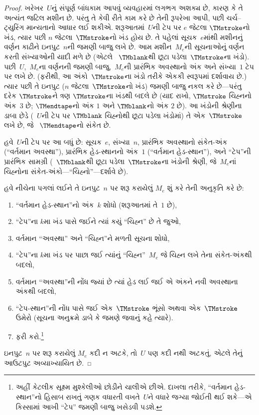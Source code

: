 \begin{proof}
  ખરેખર~$U$નું સંપૂર્ણ બાંધકામ આપવું વ્યવહારમાં લગભગ અશક્ય
  છે, કારણ કે તે અત્યંત જટિલ મશીન છે. પરંતુ તે કેવી રીતે
  કામ કરે છે તેની રૂપરેખા આપી, પછી ચર્ચ--ટ્યુરિંગ માન્યતાનો
  આધાર લઈ શકીએ. શરૂઆતમાં~$U$ની ટેપ પર $e$ જેટલા
  $\TMstroke$નો ખંડ, ત્યાર પછી $n$ જેટલા~$\TMstroke$નો
  ખંડ હોય છે. તે પહેલાં સૂચક~$e$માંથી મશીનનું વર્ણન
  કાઢીને ઇનપુટ~$n$ની જમણી બાજુ લખે છે. આમ મશીન~$M_e$ની
  સૂચનાઓનું વર્ણન કરતી સંખ્યાઓની યાદી મળે છે (એટલે
  ~$\TMblank$થી છૂટા પડેલા~$\TMstroke$ના ખંડો).
  પછી~$U$,~$M_e$ના વર્ણનની જમણી બાજુ,~$M_e$ની પ્રારંભિક
  અવસ્થાનો અંક અને સંખ્યા~$1$ ટેપ પર લખે છે. (ફરીથી,
  આ અંકો~$\TMstroke$ના ખંડો તરીકે એકકી સ્વરૂપમાં દર્શાવાય
  છે.) ત્યાર પછી તે ઇનપુટ ($n$ જેટલા~$\TMstroke$નો ખંડ)
  જમણી બાજુ નકલ કરે છે---પરંતુ દરેક $\TMstroke$ને
  ત્રણ $\TMstroke$ના ખંડથી બદલે છે (યાદ રાખો,
  $\TMstroke$ ચિહ્નનો અંક~$3$ છે; $\TMendtape$નો અંક
  $1$ અને $\TMblank$નો અંક $2$ છે). આ ખંડોની શ્રેણીના
  ડાબા છેડે (~$U$ની ટેપ પર $\TMblank$ ચિહ્નોથી છૂટા
  પડેલા ખંડોમાં) તે એક~$\TMstroke$ લખે છે, જે
  ~$\TMendtape$નો સંકેત છે.

  હવે~$U$ની ટેપ પર આ બધું છે: સૂચક~$e$, સંખ્યા~$n$,
  પ્રારંભિક અવસ્થાનો સંકેત-અંક (``વર્તમાન અવસ્થા''),
  પ્રારંભિક હેડ-સ્થાનનો અંક~$1$ (``વર્તમાન હેડ-સ્થાન''),
  અને ``ટેપ''ની પ્રારંભિક સામગ્રી (~$\TMblank$થી છૂટા
  પડેલા~$\TMstroke$ના ખંડોની શ્રેણી, જે~$M_e$નાં
  ચિહ્નોના સંકેત-અંકો---``ચિહ્નો''---દર્શાવે છે).

  હવે નીચેના પગલાં લઈને તે ઇનપુટ~$n$ પર શરૂ કરાયેલું
  $M_e$ શું કરે તેની અનુકૃતિ કરે છે:
  \begin{enumerate}
    \item ``વર્તમાન હેડ-સ્થાન''નો અંક~$k$ શોધો
    (શરૂઆતમાં તે~$1$ છે),
    \item ``ટેપ''ના $k$મા ખંડ પાસે જઈને ત્યાં કયું
    ``ચિહ્ન'' છે તે જુઓ,
    \item{}%
    વર્તમાન ``અવસ્થા'' અને ``ચિહ્ન''ને મળતી સૂચના શોધો,
    \item ``ટેપ''ના $k$મા ખંડ પર પાછા જઈ ત્યાંનું
    ``ચિહ્ન''~$M_e$ જે ચિહ્ન લખે તેના સંકેત-અંકથી બદલો,
    \item વર્તમાન ``અવસ્થા''ની નોંધ જ્યાં છે ત્યાં હેડ
    લઈ જઈ એ અંકને નવી અવસ્થાના અંકથી બદલો,
    \item ``ટેપ-સ્થાન''ની નોંધ પાસે જઈ એક~$\TMstroke$
    ભૂંસો અથવા એક~$\TMstroke$ ઉમેરો (સૂચના અનુક્રમે
    ડાબે કે જમણે જવાનું કહે ત્યારે).
    \item ફરી કરો.\footnote{અહીં કેટલીક સૂક્ષ્મ મુશ્કેલીઓ
    છોડીને ચાલીએ છીએ. દાખલા તરીકે, ``વર્તમાન હેડ-સ્થાન''નો
    હિસાબ રાખતું ગણક વધારતી વખતે~$U$ને વધારે જગ્યા
    જોઈતી થઈ શકે---એ કિસ્સામાં આખી ``ટેપ'' જમણી બાજુ
    ખસેડવી પડશે.}
  \end{enumerate}
  ઇનપુટ~$n$ પર શરૂ કરાયેલું $M_e$ કદી ન અટકે, તો~$U$
  પણ કદી નથી અટકતું, એટલે તેનું આઉટપુટ અવ્યાખ્યાયિત છે.


\end{proof}
